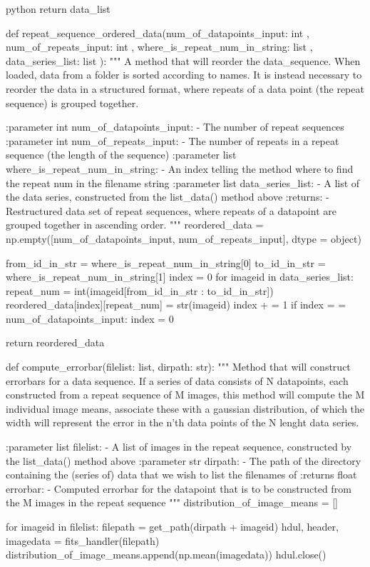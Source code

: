 \documentclass[../main.tex]{subfiles}
\begin{document}
\begin{mintedbox}{python}
return data_list


def repeat_sequence_ordered_data(num_of_datapoints_input:       int     ,
num_of_repeats_input:          int     ,
where_is_repeat_num_in_string: list    ,
data_series_list:              list        ):
"""
A method that will reorder the data_sequence. When loaded, data from a folder
is sorted according to names. It is instead necessary to reorder the data
in a structured format, where repeats of a data point (the repeat sequence) is
grouped together.

:parameter int num_of_datapoints_input:
- The number of repeat sequences
:parameter int num_of_repeats_input:
- The number of repeats in a repeat sequence (the length of the sequence)
:parameter list where_is_repeat_num_in_string:
- An index telling the method where to find the repeat num in the filename string
:parameter list data_series_list:
- A list of the data series, constructed from the list_data() method above
:returns:
- Restructured data set of repeat sequences, where repeats of a datapoint
are grouped together in ascending order.
"""
reordered_data  =  np.empty([num_of_datapoints_input, num_of_repeats_input], dtype = object)

from_id_in_str   =    where_is_repeat_num_in_string[0]
to_id_in_str     =    where_is_repeat_num_in_string[1]
index  =  0
for imageid in data_series_list:
repeat_num  =  int(imageid[from_id_in_str : to_id_in_str])
reordered_data[index][repeat_num]  =  str(imageid)
index + =  1
if index  =  =  num_of_datapoints_input:
index  =  0

return reordered_data


def compute_errorbar(filelist: list, dirpath: str):
"""
Method that will construct errorbars for a data sequence.
If a series of data consists of N datapoints, each constructed
from a repeat sequence of M images, this method will compute
the M individual image means, associate these with a gaussian
distribution, of which the width will represent the error in
the n'th data points of the N lenght data series.

:parameter list filelist:
- A list of images in the repeat sequence, constructed by
the list_data() method above
:parameter str dirpath:
- The path of the directory containing the (series of)
data that we wish to list the filenames of
:returns float errorbar:
- Computed errorbar for the datapoint that is to be constructed
from the M images in the repeat sequence
"""
distribution_of_image_means  =  []

for imageid in filelist:
filepath  =  get_path(dirpath + imageid)
hdul, header, imagedata  =  fits_handler(filepath)
distribution_of_image_means.append(np.mean(imagedata))
hdul.close()


\end{mintedbox}
\end{document}
